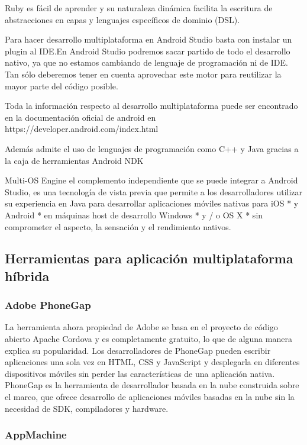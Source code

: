 \documentclass[a4paper,12pt]{mylib/publicacion}
\begin{document}
Ruby es fácil de aprender y su naturaleza dinámica facilita la escritura de abstracciones en capas y lenguajes específicos de dominio (DSL).

Para hacer desarrollo multiplataforma en Android Studio basta con instalar un plugin al IDE.En Android Studio podremos sacar partido de todo el desarrollo nativo, ya que no estamos cambiando de lenguaje de programación ni de IDE. Tan sólo deberemos tener en cuenta aprovechar este motor para reutilizar la mayor parte del código posible.

Toda la información respecto al desarrollo multiplataforma puede ser encontrado en la documentación oficial de android en https://developer.android.com/index.html

Además admite el uso de lenguajes de programación como C++ y Java gracias a la caja de herramientas Android NDK

Multi-OS Engine el complemento independiente que se puede integrar a Android Studio, es una tecnología de vista previa que permite a los desarrolladores utilizar su experiencia en Java para desarrollar aplicaciones móviles nativas para iOS * y Android * en máquinas host
de desarrollo Windows * y / o OS X * sin comprometer el aspecto, la sensación y el rendimiento nativos.


\subsection{Herramientas para aplicación multiplataforma híbrida}

\subsubsection{Adobe PhoneGap}

La herramienta ahora propiedad de Adobe se basa en el proyecto de código abierto Apache Cordova y es completamente gratuito, lo que de alguna manera explica su popularidad.
Los desarrolladores de PhoneGap pueden escribir aplicaciones una sola vez en HTML, CSS y JavaScript y desplegarla en diferentes dispositivos móviles sin perder las características de una aplicación nativa. PhoneGap es la herramienta de desarrollador basada en la nube construida sobre el marco, que ofrece desarrollo de aplicaciones móviles basadas en la nube
sin la necesidad de SDK, compiladores y hardware.

\subsubsection{AppMachine}
\end{document}
